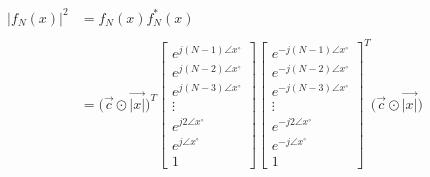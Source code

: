 \documentclass{article}
\begin{document}
\begin{align*}
    \Big|f_{N}(x)\Big|^{2}&= f_{N}(x)f^{*}_{N}(x) \\ \\
                          &= \Big(\vec{c} \odot \vec{|x|}\Big)^{T}\begin{bmatrix}
                                                                        e^{j(N - 1)\angle{x}^{\circ}} \\
                                                                        e^{j(N - 2)\angle{x}^{\circ}} \\
                                                                        e^{j(N - 3)\angle{x}^{\circ}} \\
                                                                        \vdots \\
                                                                        e^{j2\angle{x}^{\circ}} \\
                                                                        e^{j\angle{x}^{\circ}} \\
                                                                        1
                                                                    \end{bmatrix}
                                                                  \begin{bmatrix}
                                                                        e^{-j(N - 1)\angle{x}^{\circ}} \\
                                                                        e^{-j(N - 2)\angle{x}^{\circ}} \\
                                                                        e^{-j(N - 3)\angle{x}^{\circ}} \\
                                                                        \vdots \\
                                                                        e^{-j2\angle{x}^{\circ}} \\
                                                                        e^{-j\angle{x}^{\circ}} \\
                                                                        1
                                                                    \end{bmatrix}^{T}\Big(\vec{c} \odot \vec{|x|}\Big)
\end{align*}
\end{document}
